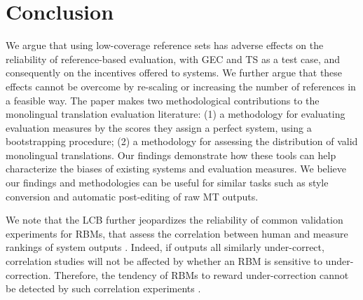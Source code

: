 \documentclass[11pt, a4paper]{article}
\begin{document}
\section{Conclusion}\label{sec:conclusion}



We argue that using low-coverage reference sets has adverse effects on the reliability
of reference-based evaluation, with GEC and TS as a test case, and consequently on the incentives offered to systems.
We further argue that these effects cannot be overcome by re-scaling or increasing the number of references in a feasible way. 
The paper makes two methodological contributions to the monolingual translation evaluation literature:
(1) a methodology for evaluating evaluation measures by the scores they assign a perfect system, using a bootstrapping procedure;
(2) a methodology for assessing the distribution of valid monolingual translations.
Our findings demonstrate how these tools can help characterize the biases of existing systems and evaluation measures.
We believe our findings and methodologies can be useful for similar tasks such as 
style conversion and automatic post-editing of raw MT outputs.

We note that the LCB further jeopardizes the reliability of common validation experiments for RBMs,
that assess the correlation between human and measure rankings of system outputs \cite{grundkiewicz2015human}.
Indeed, if outputs all similarly under-correct, correlation studies will not be affected by whether an RBM is sensitive to under-correction.
Therefore, the tendency of RBMs to reward under-correction
cannot be detected by such correlation experiments \cite[cf.][]{choshen2018maege}.
\end{document}
